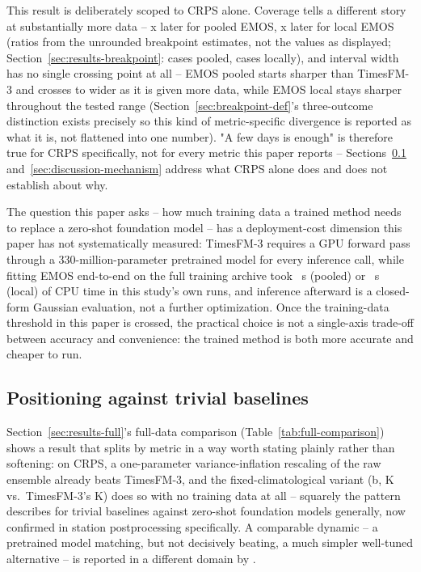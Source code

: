 This result is deliberately scoped to CRPS alone. Coverage tells a
different story at substantially more data -- \CoverageCrpsRatioPooled{}x
later for pooled EMOS, \CoverageCrpsRatioLocal{}x later for local EMOS
(ratios from the unrounded breakpoint estimates, not the values as
displayed; Section~\ref{sec:results-breakpoint}: \BpCoveragePooledCases{} cases
pooled, \BpCoverageLocalCases{} cases locally), and interval width has no
single crossing point at all -- EMOS pooled starts sharper than TimesFM-3
and crosses to wider as it is given more data, while EMOS local stays
sharper throughout the tested range (Section~\ref{sec:breakpoint-def}'s
three-outcome distinction exists precisely so this kind of metric-specific
divergence is reported as what it is, not flattened into one number). "A
few days is enough" is therefore true for CRPS specifically, not for every
metric this paper reports -- Sections~\ref{sec:discussion-trivial}
and~\ref{sec:discussion-mechanism} address what CRPS alone does and does
not establish about why.

The question this paper asks -- how much training data a trained method
needs to replace a zero-shot foundation model -- has a deployment-cost
dimension this paper has not systematically measured: TimesFM-3 requires
a GPU forward pass through a 330-million-parameter pretrained model for
every inference call, while fitting EMOS end-to-end on the full training
archive took \EmosPooledFitSeconds{}~s (pooled) or
\EmosLocalFitSeconds{}~s (local) of CPU time in this study's own runs, and
inference afterward is a closed-form Gaussian evaluation, not a further
optimization. Once the training-data threshold in this paper is crossed,
the practical choice is not a single-axis trade-off between accuracy and
convenience: the trained method is both more accurate and cheaper to run.

\subsection{Positioning against trivial baselines}
\label{sec:discussion-trivial}

Section~\ref{sec:results-full}'s full-data comparison (Table~\ref{tab:full-comparison})
shows a result that splits by metric in a way worth stating plainly rather
than softening: on CRPS, a one-parameter variance-inflation rescaling of
the raw ensemble already beats TimesFM-3, and the fixed-climatological
variant (b, \CrpsInflBFull{} K vs.\ TimesFM-3's \CrpsTsfmFull{} K) does so
with no training data at all -- squarely the pattern
\citet{zhang_2025_context_parroting} describes for trivial baselines
against zero-shot foundation models generally, now confirmed in station
postprocessing specifically. A comparable dynamic -- a pretrained model
matching, but not decisively beating, a much simpler well-tuned
alternative -- is reported in a different domain by
\citet{molinaro_2026_universal_downscaling}.

